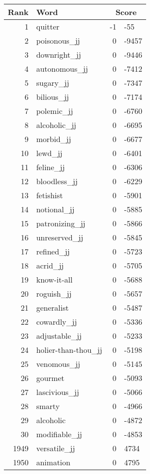 \begin{longtable}[!htbp]{| rlr@{.}l |}
    \hline
    \textbf{Rank} & \textbf{Word} & \multicolumn{2}{c|}{\textbf{Score}} \\
    \hline
    \endhead
    1 & quitter & -1 & -55 \\
    2 & poisonous\_jj & 0 & -9457 \\
    3 & downright\_jj & 0 & -9446 \\
    4 & autonomous\_jj & 0 & -7412 \\
    5 & sugary\_jj & 0 & -7347 \\
    6 & bilious\_jj & 0 & -7174 \\
    7 & polemic\_jj & 0 & -6760 \\
    8 & alcoholic\_jj & 0 & -6695 \\
    9 & morbid\_jj & 0 & -6677 \\
    10 & lewd\_jj & 0 & -6401 \\
    11 & feline\_jj & 0 & -6306 \\
    12 & bloodless\_jj & 0 & -6229 \\
    13 & fetishist & 0 & -5901 \\
    14 & notional\_jj & 0 & -5885 \\
    15 & patronizing\_jj & 0 & -5866 \\
    16 & unreserved\_jj & 0 & -5845 \\
    17 & refined\_jj & 0 & -5723 \\
    18 & acrid\_jj & 0 & -5705 \\
    19 & know-it-all & 0 & -5688 \\
    20 & roguish\_jj & 0 & -5657 \\
    21 & generalist & 0 & -5487 \\
    22 & cowardly\_jj & 0 & -5336 \\
    23 & adjustable\_jj & 0 & -5233 \\
    24 & holier-than-thou\_jj & 0 & -5198 \\
    25 & venomous\_jj & 0 & -5145 \\
    26 & gourmet & 0 & -5093 \\
    27 & lascivious\_jj & 0 & -5066 \\
    28 & smarty & 0 & -4966 \\
    29 & alcoholic & 0 & -4872 \\
    30 & modifiable\_jj & 0 & -4853 \\
    1949 & versatile\_jj & 0 & 4734 \\
    1950 & animation & 0 & 4795 \\

\end{longtable}
